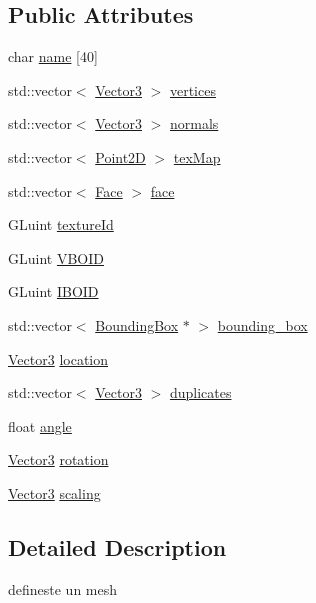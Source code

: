 \subsection*{Public Attributes}
\begin{DoxyCompactItemize}
\item 
char \hyperlink{structobject_a0c84bc492e5b46a04639699248aac2bf}{name} \mbox{[}40\mbox{]}
\item 
std\-::vector$<$ \hyperlink{struct_vector3}{Vector3} $>$ \hyperlink{structobject_a946d75bccd951d38bc1690fdf1ac8ec3}{vertices}
\item 
std\-::vector$<$ \hyperlink{struct_vector3}{Vector3} $>$ \hyperlink{structobject_a94599791d2212df04537a455d33e77d8}{normals}
\item 
std\-::vector$<$ \hyperlink{struct_point2_d}{Point2\-D} $>$ \hyperlink{structobject_ad7164f2aad0e32c7c33bc4aa2a31abd9}{tex\-Map}
\item 
std\-::vector$<$ \hyperlink{struct_face}{Face} $>$ \hyperlink{structobject_abd80dcad30e5ad35a5b85e091d3dcdce}{face}
\item 
G\-Luint \hyperlink{structobject_a95c649f449cd461768418b5adfa4d3f2}{texture\-Id}
\item 
G\-Luint \hyperlink{structobject_a0a8d492eb2cf2c7a4649c632cd8548fd}{V\-B\-O\-I\-D}
\item 
G\-Luint \hyperlink{structobject_a2172358a3a70a1ae7cacf9d42d2f81d0}{I\-B\-O\-I\-D}
\item 
std\-::vector$<$ \hyperlink{class_bounding_box}{Bounding\-Box} $\ast$ $>$ \hyperlink{structobject_acc14551671b33bc6f1204659e581ade8}{bounding\-\_\-box}
\item 
\hyperlink{struct_vector3}{Vector3} \hyperlink{structobject_ada1bd59a43bb6fd1698897cbc307ace9}{location}
\item 
std\-::vector$<$ \hyperlink{struct_vector3}{Vector3} $>$ \hyperlink{structobject_aba41d6189c68f5b55b17d467258d3365}{duplicates}
\item 
float \hyperlink{structobject_ae5a08c19bc968358c53cedad8a1a6ca3}{angle}
\item 
\hyperlink{struct_vector3}{Vector3} \hyperlink{structobject_aca33f4c591578298adeaedec0d354e9a}{rotation}
\item 
\hyperlink{struct_vector3}{Vector3} \hyperlink{structobject_a0d2429466fa7d9a13c1257cd043594c3}{scaling}
\end{DoxyCompactItemize}


\subsection{Detailed Description}
defineste un mesh 

